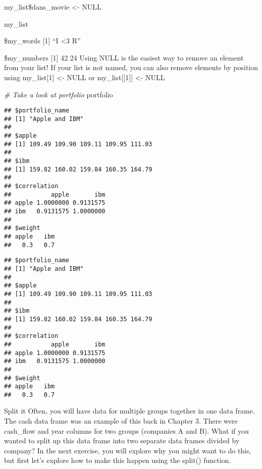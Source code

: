 \documentclass[]{article}
\newenvironment{Shaded}{\begin{snugshade}}{\end{snugshade}}
\newcommand{\CommentTok}[1]{\textcolor[rgb]{0.56,0.35,0.01}{\textit{#1}}}
\newcommand{\OtherTok}[1]{\textcolor[rgb]{0.56,0.35,0.01}{#1}}
\newcommand{\OperatorTok}[1]{\textcolor[rgb]{0.81,0.36,0.00}{\textbf{#1}}}
\newcommand{\NormalTok}[1]{#1}
\begin{document}
my\_list\$dans\_movie \textless{}- NULL

my\_list

\$my\_words {[}1{]} ``I \textless{}3 R''

\$my\_numbers {[}1{]} 42 24 Using NULL is the easiest way to remove an
element from your list! If your list is not named, you can also remove
elements by position using my\_list{[}1{]} \textless{}- NULL or
my\_list{[}{[}1{]}{]} \textless{}- NULL

\begin{Shaded}
\begin{Highlighting}[]
\CommentTok{# Take a look at portfolio}
\NormalTok{portfolio}
\end{Highlighting}
\end{Shaded}

\begin{verbatim}
## $portfolio_name
## [1] "Apple and IBM"
## 
## $apple
## [1] 109.49 109.90 109.11 109.95 111.03
## 
## $ibm
## [1] 159.82 160.02 159.84 160.35 164.79
## 
## $correlation
##           apple       ibm
## apple 1.0000000 0.9131575
## ibm   0.9131575 1.0000000
## 
## $weight
## apple   ibm 
##   0.3   0.7
\end{verbatim}

\begin{Shaded}
\end{Shaded}

\begin{verbatim}
## $portfolio_name
## [1] "Apple and IBM"
## 
## $apple
## [1] 109.49 109.90 109.11 109.95 111.03
## 
## $ibm
## [1] 159.82 160.02 159.84 160.35 164.79
## 
## $correlation
##           apple       ibm
## apple 1.0000000 0.9131575
## ibm   0.9131575 1.0000000
## 
## $weight
## apple   ibm 
##   0.3   0.7
\end{verbatim}

Split it Often, you will have data for multiple groups together in one
data frame. The cash data frame was an example of this back in Chapter
3. There were cash\_flow and year columns for two groups (companies A
and B). What if you wanted to split up this data frame into two separate
data frames divided by company? In the next exercise, you will explore
why you might want to do this, but first let's explore how to make this
happen using the split() function.
\end{document}
